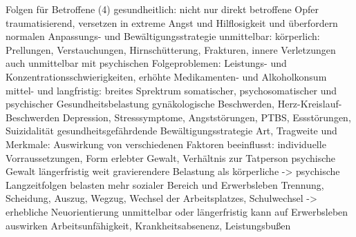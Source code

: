 Folgen für Betroffene (4)
\parencite{Def_Form_Folge_Gewalt}
gesundheitlich:
    nicht nur direkt betroffene Opfer
    traumatisierend, versetzen in extreme Angst und Hilflosigkeit und überfordern normalen Anpassungs- und Bewältigungsstrategie
unmittelbar:
    körperlich: Prellungen, Verstauchungen, Hirnschütterung, Frakturen, innere Verletzungen
    auch unmittelbar mit psychischen Folgeproblemen: Leistungs- und Konzentrationsschwierigkeiten, erhöhte Medikamenten- und Alkoholkonsum
mittel- und langfristig:
    breites Sprektrum somatischer, psychosomatischer und psychischer Gesundheitsbelastung
    gynäkologische Beschwerden, Herz-Kreislauf-Beschwerden
    Depression, Stresssymptome, Angststörungen, PTBS, Essstörungen, Suizidalität
    gesundheitsgefährdende Bewältigungsstrategie
Art, Tragweite und Merkmale:
    Auswirkung von verschiedenen Faktoren beeinflusst: individuelle Vorraussetzungen, Form erlebter Gewalt, Verhältnis zur Tatperson
    psychische Gewalt längerfristig weit gravierendere Belastung als körperliche    -> psychische Langzeitfolgen belasten mehr
sozialer Bereich und Erwerbsleben
    Trennung, Scheidung, Auszug, Wegzug, Wechsel der Arbeitsplatzes, Schulwechsel   -> erhebliche Neuorientierung
    unmittelbar oder längerfristig kann auf Erwerbsleben auswirken
    Arbeitsunfähigkeit, Krankheitsabsenenz, Leistungsbußen




